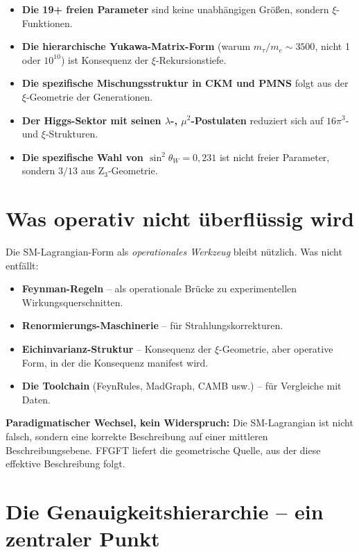 \documentclass[11pt,a4paper]{article}
\begin{document}
\begin{itemize}\itemsep2pt
\item \textbf{Die 19+ freien Parameter} sind keine unabhängigen Größen, sondern $\xi$-Funktionen.
\item \textbf{Die hierarchische Yukawa-Matrix-Form} (warum $m_\tau / m_e \sim 3500$, nicht 1 oder $10^{10}$) ist Konsequenz der $\xi$-Rekursionstiefe.
\item \textbf{Die spezifische Mischungsstruktur in CKM und PMNS} folgt aus der $\xi$-Geometrie der Generationen.
\item \textbf{Der Higgs-Sektor mit seinen $\lambda$-, $\mu^2$-Postulaten} reduziert sich auf $16\pi^3$- und $\xi$-Strukturen.
\item \textbf{Die spezifische Wahl von $\sin^2\theta_W = 0{,}231$} ist nicht freier Parameter, sondern $3/13$ aus Z$_3$-Geometrie.
\end{itemize}

\section{Was operativ nicht überflüssig wird}

Die SM-Lagrangian-Form als \emph{operationales Werkzeug} bleibt nützlich. Was nicht entfällt:

\begin{itemize}\itemsep2pt
\item \textbf{Feynman-Regeln} -- als operationale Brücke zu experimentellen Wirkungsquerschnitten.
\item \textbf{Renormierungs-Maschinerie} -- für Strahlungskorrekturen.
\item \textbf{Eichinvarianz-Struktur} -- Konsequenz der $\xi$-Geometrie, aber operative Form, in der die Konsequenz manifest wird.
\item \textbf{Die Toolchain} (FeynRules, MadGraph, CAMB usw.) -- für Vergleiche mit Daten.
\end{itemize}

\textbf{Paradigmatischer Wechsel, kein Widerspruch:} Die SM-Lagrangian ist nicht falsch, sondern eine korrekte Beschreibung auf einer mittleren Beschreibungsebene. FFGFT liefert die geometrische Quelle, aus der diese effektive Beschreibung folgt.

\section{Die Genauigkeitshierarchie -- ein zentraler Punkt}
\end{document}
